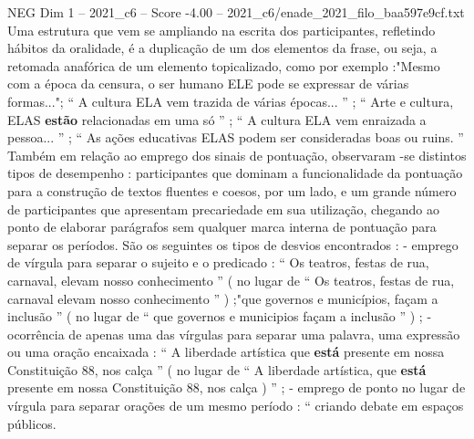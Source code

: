 \begin{textsample}{NEG Dim 1 – 2021\_c6 – Score -4.00 – 2021\_c6/enade\_2021\_filo\_baa597e9cf.txt}
Uma estrutura que vem se ampliando na escrita dos participantes, refletindo hábitos da oralidade, é a duplicação de um dos elementos da frase, ou seja, a retomada anafórica de um elemento topicalizado, como por exemplo :"Mesmo com a época da censura, o ser humano ELE pode se expressar de várias formas..."; “ A cultura ELA vem trazida de várias épocas... ” ; “ Arte e cultura, ELAS \textbf{estão} relacionadas em uma só ” ; “ A cultura ELA vem enraizada a pessoa... ” ; “ As ações educativas ELAS podem ser consideradas boas ou ruins. ” Também em relação ao emprego dos sinais de pontuação, observaram -se distintos tipos de desempenho : participantes que dominam a funcionalidade da pontuação para a construção de textos fluentes e coesos, por um lado, e um grande número de participantes que apresentam precariedade em sua utilização, chegando ao ponto de elaborar parágrafos sem qualquer marca interna de pontuação para separar os períodos.
São os seguintes os tipos de desvios encontrados : - emprego de vírgula para separar o sujeito e o predicado : “ Os teatros, festas de rua, carnaval, elevam nosso conhecimento ” ( no lugar de “ Os teatros, festas de rua, carnaval elevam nosso conhecimento ” ) ;"que governos e municípios, façam a inclusão ” ( no lugar de “ que governos e municipios façam a inclusão ” ) ; - ocorrência de apenas uma das vírgulas para separar uma palavra, uma expressão ou uma oração encaixada : “ A liberdade artística que \textbf{está} presente em nossa Constituição 88, nos calça ” ( no lugar de “ A liberdade artística, que \textbf{está} presente em nossa Constituição 88, nos calça ) ” ; - emprego de ponto no lugar de vírgula para separar orações de um mesmo período : “ criando debate em espaços públicos.

\end{textsample}
